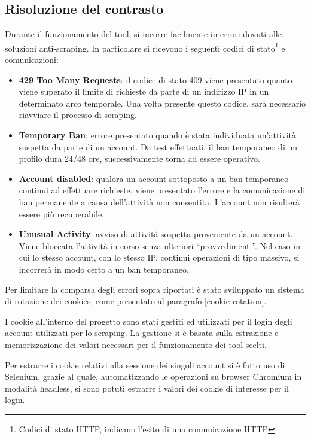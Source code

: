 \subsection{Risoluzione del contrasto}
Durante il funzionamento del tool, si incorre facilmente in errori dovuti alle soluzioni anti-scraping. In particolare si ricevono i seguenti codici di stato\footnote{Codici di stato HTTP, indicano l'esito di una comunicazione HTTP} e comunicazioni:
\begin{itemize}
    \item \textbf{429 Too Many Requests}: il codice di stato 409 viene presentato quanto viene superato il limite di richieste da parte di un indirizzo IP in un determinato arco temporale. Una volta presente questo codice, sar\`a necessario riavviare il processo di scraping.
    \item \textbf{Temporary Ban}: errore presentato quando \`e stata individuata un'attivit\`a sospetta da parte di un account. Da test effettuati, il ban temporaneo di un profilo dura 24/48 ore, successivamente torna ad essere operativo.
    \item \textbf{Account disabled}: qualora un account sottoposto a un ban temporaneo continui ad effettuare richieste, viene presentato l'errore e la comunicazione di ban permanente a causa dell'attivit\`a non consentita. L'account non risulter\`a essere pi\`u recuperabile.
    \item \textbf{Unusual Activity}: avviso di attivit\`a sospetta proveniente da un account. Viene bloccata l'attivit\`a in corso senza ulteriori ``provvedimenti''. Nel caso in cui lo stesso account, con lo stesso IP, continui operazioni di tipo massivo, si incorrer\`a in modo certo a un ban temporaneo.
\end{itemize}
Per limitare la comparsa degli errori sopra riportati \`e stato sviluppato un sistema di rotazione dei cookies, come presentato al paragrafo \ref{cookie rotation}.

I cookie all'interno del progetto sono stati gestiti ed utilizzati per il login degli account utilizzati per lo scraping. La gestione si \`e basata sulla estrazione e memorizzazione dei valori necessari per il funzionamento dei tool scelti.

Per estrarre i cookie relativi alla sessione dei singoli account si \`e fatto uso di Selenium, grazie al quale, automatizzando le operazioni su browser Chromium in modalit\`a headless, si sono potuti estrarre i valori dei cookie di interesse per il login.

